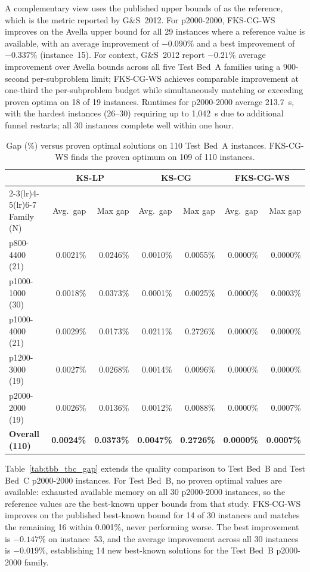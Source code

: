 A complementary view uses the published upper bounds of \citet{avella2008effective}
as the reference, which is the metric reported by G\&S~2012.
For p2000-2000, FKS-CG-WS improves on the Avella upper bound for all 29 instances
where a reference value is available, with an average improvement of $-0.090\%$
and a best improvement of $-0.337\%$ (instance~15).
For context, G\&S~2012 report $-0.21\%$ average improvement over Avella bounds
across all five Test Bed~A families using a 900-second per-subproblem limit;
FKS-CG-WS achieves comparable improvement at one-third the per-subproblem budget
while simultaneously matching or exceeding proven optima on 18 of 19 instances.
Runtimes for p2000-2000 average 213.7~s, with the hardest instances (26--30)
requiring up to 1{,}042~s due to additional funnel restarts; all 30 instances
complete well within one hour.

\begin{table}[htbp]
\centering
\caption{Gap (\%) versus proven optimal solutions on 110 Test Bed~A instances.
         FKS-CG-WS finds the proven optimum on 109 of 110 instances.}
\label{tab:proven_optima_gap}
\footnotesize
\setlength{\tabcolsep}{4pt}
\begin{tabular}{lrrrrrr}
\toprule
& \multicolumn{2}{c}{KS-LP} & \multicolumn{2}{c}{KS-CG} & \multicolumn{2}{c}{FKS-CG-WS} \\
\cmidrule(lr){2-3}\cmidrule(lr){4-5}\cmidrule(lr){6-7}
Family (N) & Avg.\ gap & Max gap & Avg.\ gap & Max gap & Avg.\ gap & Max gap \\
\midrule
p800-4400 (21)   & 0.0021\% & 0.0246\% & 0.0010\% & 0.0055\% & 0.0000\% & 0.0000\% \\
p1000-1000 (30)  & 0.0018\% & 0.0373\% & 0.0001\% & 0.0025\% & 0.0000\% & 0.0003\% \\
p1000-4000 (21)  & 0.0029\% & 0.0173\% & 0.0211\% & 0.2726\% & 0.0000\% & 0.0000\% \\
p1200-3000 (19)  & 0.0027\% & 0.0268\% & 0.0014\% & 0.0096\% & 0.0000\% & 0.0000\% \\
p2000-2000 (19)  & 0.0026\% & 0.0136\% & 0.0012\% & 0.0088\% & 0.0000\% & 0.0007\% \\
\midrule
\textbf{Overall (110)} & \textbf{0.0024\%} & \textbf{0.0373\%} & \textbf{0.0047\%} & \textbf{0.2726\%} & \textbf{0.0000\%} & \textbf{0.0007\%} \\
\bottomrule
\end{tabular}
\end{table}

Table~\ref{tab:tbb_tbc_gap} extends the quality comparison to Test Bed~B and
Test Bed~C p2000-2000 instances.
For Test Bed~B, no proven optimal values are available:
\citet{caserta2020corridor} exhausted available memory on all 30 p2000-2000
instances, so the reference values are the best-known upper bounds from that study.
FKS-CG-WS improves on the published best-known bound for 14 of 30 instances and
matches the remaining 16 within 0.001\%, never performing worse.
The best improvement is $-0.147\%$ on instance~53, and the average improvement
across all 30 instances is $-0.019\%$, establishing 14 new best-known solutions
for the Test Bed~B p2000-2000 family.

